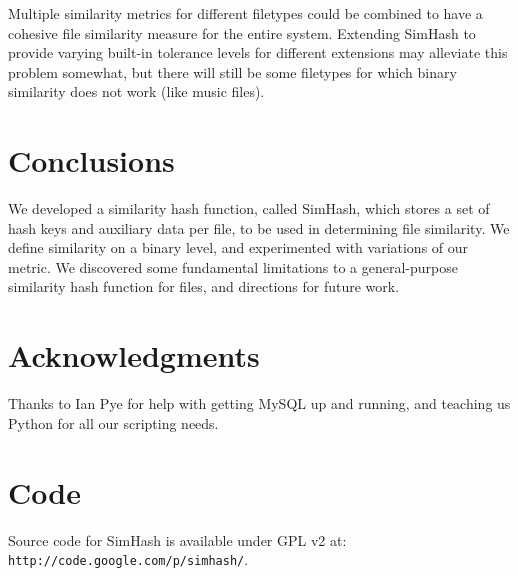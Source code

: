 \documentclass[10pt, twocolumn]{article}
\begin{document}
Multiple similarity metrics for different filetypes could be combined to have a cohesive file similarity measure for the entire system. Extending SimHash to provide varying built-in tolerance levels for different extensions may alleviate this problem somewhat, but there will still be some filetypes for which binary similarity does not work (like music files).

\section{Conclusions}

We developed a similarity hash function, called SimHash, which stores a set of hash keys and auxiliary data per file, to be used in determining file similarity. We define similarity on a binary level, and experimented with variations of our metric. We discovered some fundamental limitations to a general-purpose similarity hash function for files, and directions for future work.

\section{Acknowledgments}
Thanks to Ian Pye for help with getting MySQL up and running, and teaching us Python for all our scripting needs.

\section{Code}

Source code for SimHash is available under GPL v2 at: { \tt http://code.google.com/p/simhash/}.






\end{document}
